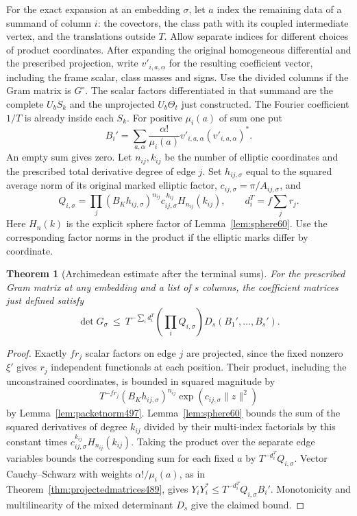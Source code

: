 \documentclass[a4paper,11pt]{article}
\newtheorem{theorem}[proposition]{Theorem}
\theoremstyle{definition}
\theoremstyle{remark}
\numberwithin{equation}{section}
\begin{document}
For the exact expansion at an embedding \(\sigma\), let \(a\)
index the remaining data of a summand of column \(i\): the
covectors, the class path with its coupled intermediate vertex,
and the translations outside \(T\). Allow separate indices
for different choices of product coordinates. After expanding
the original homogeneous differential and the prescribed
projection, write \(v'_{i,a,\alpha}\) for the resulting coefficient
vector, including the frame scalar, class masses and signs. Use
the divided columns if the Gram matrix is \(G^\circ\).
The scalar factors differentiated in that summand are the
complete \(U_bS_k\) and the unprojected \(U_b\Theta_t\) just
constructed. The Fourier coefficient \(1/T\) is already inside
each \(S_k\). For positive \(\mu_i(a)\) of sum one put
\[
  B_i'=\sum_{a,\alpha}\frac{\alpha!}{\mu_i(a)}
                 v'_{i,a,\alpha}(v'_{i,a,\alpha})^* .
\]
An empty sum gives zero. Let \(n_{ij},k_{ij}\) be the number
of elliptic coordinates and the prescribed total derivative
degree of edge \(j\). Set \(h_{ij,\sigma}\) equal to the squared
average norm of its original marked elliptic factor, \(c_{ij,\sigma}
=\pi/A_{ij,\sigma}\), and
\[
  Q_{i,\sigma}=\prod_j
       (B_K h_{ij,\sigma})^{n_{ij}}c_{ij,\sigma}^{\,k_{ij}}
                          H_{n_{ij}}(k_{ij}),\qquad
  d_i^T=f\sum_j r_j .
\]
Here \(H_n(k)\) is the explicit sphere factor of
Lemma~\ref{lem:sphere60}. Use the corresponding factor norms
in the product if the elliptic marks differ by coordinate.

\begin{theorem}[Archimedean estimate after the terminal sums]\leavevmode
\label{thm:packetgram497}
For the prescribed Gram matrix at any embedding and a list
of \(s\) columns, the coefficient matrices just defined satisfy
\[
     \det G_\sigma\ \le\
         T^{-\sum_i d_i^T}
           \left(\prod_i Q_{i,\sigma}\right)
                              D_s(B_1',\ldots,B_s').
\]
\end{theorem}
\begin{proof}
Exactly \(fr_j\) scalar factors on edge \(j\) are projected,
since the fixed nonzero \(\xi'\) gives \(r_j\) independent
functionals at each position. Their product, including the
unconstrained coordinates, is bounded in squared magnitude by
\[
       T^{-fr_j}(B_Kh_{ij,\sigma})^{n_{ij}}
               \exp(c_{ij,\sigma}\|z\|^2)
\]
by Lemma~\ref{lem:packetnorm497}. Lemma~\ref{lem:sphere60}
bounds the sum of the squared derivatives of degree \(k_{ij}\)
divided by their multi-index factorials by this constant
times \(c_{ij,\sigma}^{k_{ij}}H_{n_{ij}}(k_{ij})\).
Taking the product over the separate edge variables bounds
the corresponding sum for each fixed \(a\) by
\(T^{-d_i^T}Q_{i,\sigma}\). Vector Cauchy--Schwarz with weights
\(\alpha!/\mu_i(a)\), as in Theorem~\ref{thm:projectedmatrices489},
gives \(Y_iY_i^*\le T^{-d_i^T}Q_{i,\sigma}B_i'\).
Monotonicity and multilinearity of the mixed determinant
\(D_s\) give the claimed bound.
\end{proof}
\end{document}
